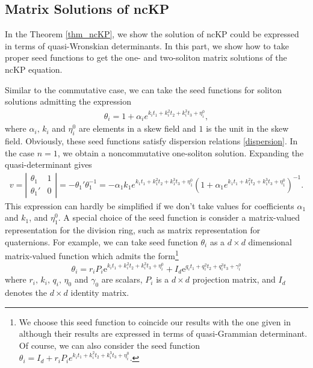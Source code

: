 \documentclass[11p,reqno]{amsart}
\numberwithin{equation}{section}
\numberwithin{equation}{section}
\begin{document}
\subsection{Matrix Solutions of ncKP}
In the Theorem \ref{thm_ncKP}, we show the solution of ncKP could be expressed in terms of quasi-Wronskian determinants. In this part, we show how to take proper seed functions to get the one- and two-soliton matrix solutions of the ncKP equation. 


Similar to the commutative case, we can take the seed functions for soliton solutions admitting the expression
\begin{align*}
\theta_i=1+\alpha_i e^{k_it_1+k_i^2t_2+k_i^3t_3+\eta_i^0},
\end{align*}
where $\alpha_i,\,k_i$ and $\eta_i^0$ are elements in a skew field and $1$ is the unit in the skew field. 
Obviously, these seed functions satisfy dispersion relations \eqref{dispersion}.
In the case $n=1$, we obtain a noncommutative one-soliton solution. Expanding the quasi-determinant gives
\begin{align*}
        v = \left|\begin{array}{cc}
        \theta_1&1\\
        \theta_1'&\boxed{0}
        \end{array}
        \right|=-\theta_1'\theta_1^{-1}=-\alpha_1k_1e^{k_1t_1+k_1^2t_2+k_1^3t_3+\eta_1^0}(1+\alpha_1e^{k_1t_1+k_1^2t_2+k_1^3t_3+\eta_1^0})^{-1}.
\end{align*}        
This expression can hardly be simplified if we don't take values for coefficients $\alpha_1$ and $k_1$, and $\eta_1^0$. A special choice of the seed function is consider a matrix-valued representation for the 
division ring, such as matrix representation for quaternions. For example, 
we can take seed function $\theta_i$ as a $d\times d$ dimensional matrix-valued function which admits the form\footnote{We choose this seed function to coincide our results with the one given in  \cite[Eq.18]{gilson09} although their results are expressed in terms of quasi-Grammian determinant. Of course, we can also consider the seed function $\theta_i=I_d+r_iP_ie^{k_it_1+k_i^2t_2+k_i^3t_3+\eta_i^0}$.}
\begin{equation} \label{seed-kp}
    \theta_i = r_i P_i \mathrm{e}^{ k_i t_1 + k_i^2 t_2 + k_i^3 t_3 + \eta_i^0} + I_d \mathrm{e}^{q_i t_1 + q_i^2 t_2 + q_i^3 t_3 + \gamma_i^0}
\end{equation}
where  $r_i, \, k_i,\,q_i,\,\eta_0$ and $\gamma_0$ are scalars, $P_i$ is a $d \times d$ projection matrix, and $I_d$ denotes the $d \times d$ identity matrix.
\end{document}
